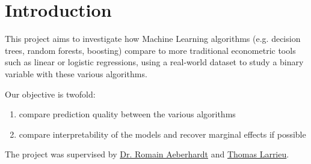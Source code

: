 \chapter{Introduction}

This project aims to investigate how Machine Learning algorithms (e.g. decision trees, random
forests, boosting) compare to more traditional econometric tools such as linear or logistic
regressions, using a real-world dataset \cite{enquete} to study a binary variable with these
various algorithms.

Our objective is twofold:
\begin{enumerate}[nosep]
    \item compare prediction quality between the various algorithms
    \item compare interpretability of the models and recover marginal effects if possible
\end{enumerate}

The project was supervised by \href{http://www.crest.fr/pagesperso.php?user=3045}{Dr. Romain
Aeberhardt} and \href{http://thomas-larrieu.strikingly.com/}{Thomas Larrieu}.

